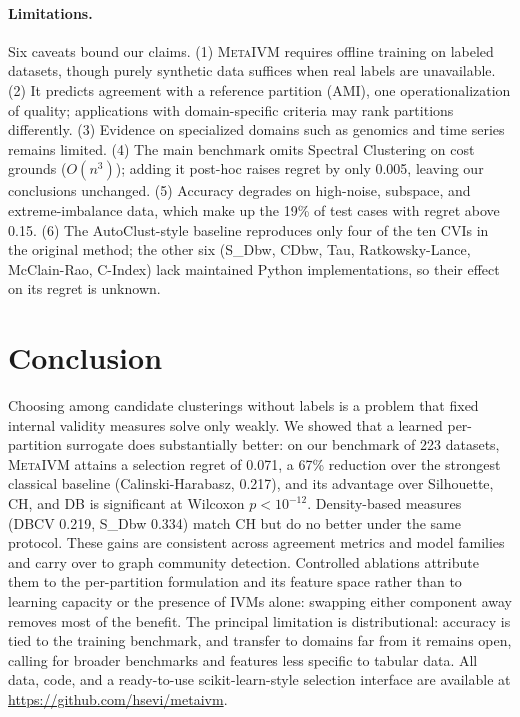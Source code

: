 \documentclass[10pt]{article} %
\newcommand{\ours}{\textsc{MetaIVM}}
\begin{document}
\paragraph{Limitations.} Six caveats bound our claims. (1) \ours{} requires offline training on labeled datasets, though purely synthetic data suffices when real labels are unavailable. (2) It predicts agreement with a reference partition (AMI), one operationalization of quality; applications with domain-specific criteria may rank partitions differently. (3) Evidence on specialized domains such as genomics and time series remains limited. (4) The main benchmark omits Spectral Clustering on cost grounds ($O(n^3)$); adding it post-hoc raises regret by only 0.005, leaving our conclusions unchanged. (5) Accuracy degrades on high-noise, subspace, and extreme-imbalance data, which make up the 19\% of test cases with regret above 0.15. (6) The AutoClust-style baseline reproduces only four of the ten CVIs in the original method; the other six (S\_Dbw, CDbw, Tau, Ratkowsky-Lance, McClain-Rao, C-Index) lack maintained Python implementations, so their effect on its regret is unknown.


\section{Conclusion}
\label{sec:conclusion}

Choosing among candidate clusterings without labels is a problem that fixed internal validity measures solve only weakly. We showed that a learned per-partition surrogate does substantially better: on our benchmark of 223 datasets, \ours{} attains a selection regret of 0.071, a 67\% reduction over the strongest classical baseline (Calinski-Harabasz, 0.217), and its advantage over Silhouette, CH, and DB is significant at Wilcoxon $p < 10^{-12}$. Density-based measures (DBCV 0.219, S\_Dbw 0.334) match CH but do no better under the same protocol. These gains are consistent across agreement metrics and model families and carry over to graph community detection. Controlled ablations attribute them to the per-partition formulation and its feature space rather than to learning capacity or the presence of IVMs alone: swapping either component away removes most of the benefit. The principal limitation is distributional: accuracy is tied to the training benchmark, and transfer to domains far from it remains open, calling for broader benchmarks and features less specific to tabular data. All data, code, and a ready-to-use scikit-learn-style selection interface are available at \url{https://github.com/hsevi/metaivm}.
\end{document}
